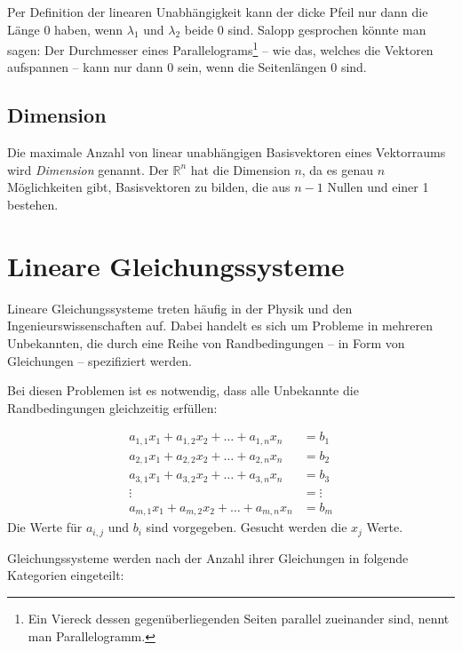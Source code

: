 \bigskip

Per Definition der linearen Unabhängigkeit kann der dicke Pfeil nur dann die Länge 0 haben, wenn $\lambda_1$ und $\lambda_2$ beide 0 sind. Salopp gesprochen könnte man sagen: Der Durchmesser eines Parallelograms\footnote{Ein Viereck dessen gegenüberliegenden Seiten parallel zueinander sind, nennt man Parallelogramm.} -- wie das, welches die Vektoren aufspannen -- kann nur dann 0 sein, wenn die Seitenlängen 0 sind.

\subsection{Dimension}

\begin{definition}
Die maximale Anzahl von linear unabhängigen Basisvektoren eines Vektorraums wird \emph{Dimension} genannt. Der $\mathbb{R}^n$ hat die Dimension $n$, da es genau $n$ Möglichkeiten gibt, Basisvektoren zu bilden, die aus $n-1$ Nullen und einer 1 bestehen.
\end{definition}


\section{Lineare Gleichungssysteme}

Lineare Gleichungssysteme treten häufig in der Physik und den Ingenieurswissenschaften auf. Dabei handelt es sich um Probleme in mehreren Unbekannten, die durch eine Reihe von Randbedingungen -- in Form von Gleichungen -- spezifiziert werden.

Bei diesen Problemen ist es notwendig, dass alle Unbekannte die Randbedingungen gleichzeitig erfüllen:

\begin{equation}\label{eq:syseq}
\begin{split}
a_{1,1}x_1 + a_{1,2}x_2 + \dots + a_{1,n}x_n &= b_1 \\
a_{2,1}x_1 + a_{2,2}x_2 + \dots + a_{2,n}x_n &= b_2 \\
a_{3,1}x_1 + a_{3,2}x_2 + \dots + a_{3,n}x_n &= b_3 \\
\vdots &= \vdots \\
a_{m,1}x_1 + a_{m,2}x_2 + \dots + a_{m,n}x_n &= b_m 
\end{split}
\end{equation}
Die Werte für $a_{i,j}$ und $b_{i}$ sind vorgegeben. Gesucht werden die $x_j$ Werte. 

Gleichungssysteme werden nach der Anzahl ihrer Gleichungen in folgende Kategorien eingeteilt:

